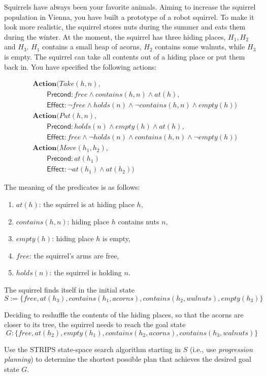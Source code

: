 Squirrels have always been your favorite animals. Aiming to increase the squirrel population in Vienna, you have built a prototype of a robot squirrel. To make it look more realistic, the squirrel stores nuts during the summer and eats them during the winter. At the moment, the squirrel has three hiding places, $H_1 , H_2$ and $H_3$. $H_1$ contains a small heap of acorns, $H_2$ contains some walnuts, while $H_3$ is empty. The squirrel can take all contents out of a hiding place or put them back in. You have specified the following actions:

\begin{align*}
    &\textbf{Action}(Take(h,n),\\
    &\qquad \textsf{Precond} : free \land contains(h,n) \land at(h),\\
    &\qquad \textsf{Effect} : \neg free \land holds(n) \land \neg contains(h,n) \land empty(h))
    \\
    &\textbf{Action}(Put(h,n),\\
    &\qquad \textsf{Precond} : holds(n) \land empty(h) \land at(h),\\
    &\qquad \textsf{Effect} : free \land \neg holds(n) \land contains(h,n) \land \neg empty(h))
    \\
    &\textbf{Action}(Move(h_1,h_2),\\
    &\qquad \textsf{Precond} : at(h_1)\\
    &\qquad \textsf{Effect} : \neg at(h_1) \land at(h_2))
\end{align*}

The meaning of the predicates is as follows:
\begin{enumerate}[label={}]
    \item $at(h)$: the squirrel is at hiding place $h$,
    \item $contains(h,n)$: hiding place $h$ contains nuts $n$,
    \item $empty(h)$: hiding place $h$ is empty,
    \item $free$: the squirrel's arms are free,
    \item $holds(n)$: the squirrel is holding $n$.
\end{enumerate}

The squirrel finds itself in the initial state
\[S:=\{free, at(h_3),contains(h_1,acorns),contains(h_2,walnuts),empty(h_3)\}\]

Deciding to reshuffle the contents of the hiding places, so that the acorns are closer to its tree, the squirrel needs to reach the goal state
\[G:\{free,at(h_2),empty(h_1),contains(h_2,acorns),contains(h_3,walnuts)\}\]

Use the STRIPS state-space search algorithm starting in $S$ (i.e., use \textit{progression planning}) to determine the shortest possible plan that achieves the desired goal state $G$.